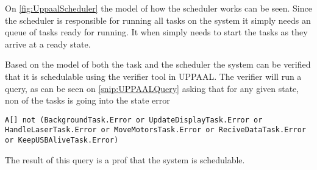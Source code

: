 
On \autoref{fig:UppaalScheduler} the model of how the scheduler works can be seen. 
Since the scheduler is responsible for running all tasks on the system it simply needs an queue of tasks ready for running. 
It when simply needs to start the tasks as they arrive at a ready state. 

Based on the model of both the task and the scheduler the system can be verified that it is schedulable using the verifier tool in UPPAAL. 
The verifier will run a query, as can be seen on \autoref{snip:UPPAALQuery} asking that for any given state, non of the tasks is going into the state error 
\begin{lstlisting}[label={snip:UPPAALQuery},caption={Query from UPPAAL verifier},frame=tlrb,numbers=none]
A[] not (BackgroundTask.Error or UpdateDisplayTask.Error or HandleLaserTask.Error or MoveMotorsTask.Error or ReciveDataTask.Error or KeepUSBAliveTask.Error)
\end{lstlisting}
The result of this query is a prof that the system is schedulable. 